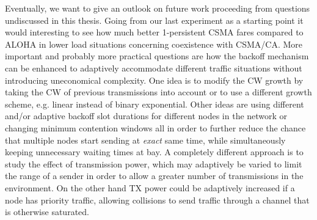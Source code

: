 Eventually, we want to give an outlook on future work proceeding from questions undiscussed in this thesis. Going from our last experiment as a starting point it would interesting to see how much better 1-persistent CSMA fares compared to ALOHA in lower load situations concerning coexistence with CSMA/CA. More important and probably more practical questions are how the backoff mechanism can be enhanced to adaptively accommodate different traffic situations without introducing uneconomical complexity. One idea is to modify the CW growth by taking the CW of previous transmissions into account or to use a different growth scheme, e.g. linear instead of binary exponential. Other ideas are using different and/or adaptive backoff slot durations for different nodes in the network or changing minimum contention windows all in order to further reduce the chance that multiple nodes start sending at \emph{exact} same time, while simultaneously keeping unnecessary waiting times at bay. A completely different approach is to study the effect of transmission power, which may adaptively be varied to limit the range of a sender in order to allow a greater number of transmissions in the environment. On the other hand TX power could be adaptively increased if a node has priority traffic, allowing collisions to send traffic through a channel that is otherwise saturated. 
